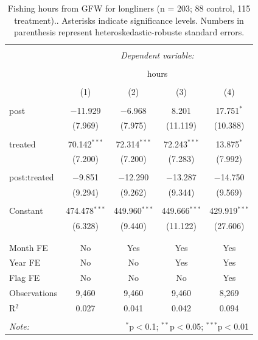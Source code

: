 \documentclass[12pt,]{article}
\begin{document}
\begin{table}[!htbp] \centering 
  \caption{\label{tab:long}Fishing hours from GFW for longliners (n = 203; 88 control, 115 treatment).. Asterisks indicate significance levels. Numbers in parenthesis represent heteroskedastic-robuste standard errors.} 
  \label{} 
\begin{tabular}{@{\extracolsep{5pt}}lcccc} 
\\[-1.8ex]\hline 
\hline \\[-1.8ex] 
 & \multicolumn{4}{c}{\textit{Dependent variable:}} \\ 
\cline{2-5} 
\\[-1.8ex] & \multicolumn{4}{c}{hours} \\ 
\\[-1.8ex] & (1) & (2) & (3) & (4)\\ 
\hline \\[-1.8ex] 
 post & $-$11.929 & $-$6.968 & 8.201 & 17.751$^{*}$ \\ 
  & (7.969) & (7.975) & (11.119) & (10.388) \\ 
  & & & & \\ 
 treated & 70.142$^{***}$ & 72.314$^{***}$ & 72.243$^{***}$ & 13.875$^{*}$ \\ 
  & (7.200) & (7.200) & (7.283) & (7.992) \\ 
  & & & & \\ 
 post:treated & $-$9.851 & $-$12.290 & $-$13.287 & $-$14.750 \\ 
  & (9.294) & (9.262) & (9.344) & (9.569) \\ 
  & & & & \\ 
 Constant & 474.478$^{***}$ & 449.960$^{***}$ & 449.666$^{***}$ & 429.919$^{***}$ \\ 
  & (6.328) & (9.440) & (11.122) & (27.606) \\ 
  & & & & \\ 
\hline \\[-1.8ex] 
Month FE & No & Yes & Yes & Yes \\ 
Year FE & No & No & Yes & Yes \\ 
Flag FE & No & No & No & Yes \\ 
Observations & 9,460 & 9,460 & 9,460 & 8,269 \\ 
R$^{2}$ & 0.027 & 0.041 & 0.042 & 0.094 \\ 
\hline 
\hline \\[-1.8ex] 
\textit{Note:}  & \multicolumn{4}{r}{$^{*}$p$<$0.1; $^{**}$p$<$0.05; $^{***}$p$<$0.01} \\ 
\end{tabular} 
\end{table}

\clearpage


\end{document}
